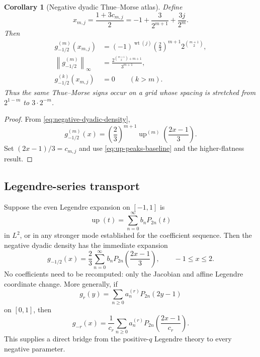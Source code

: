 \documentclass[11pt]{article}
\newtheorem{corollary}[theorem]{Corollary}
\theoremstyle{definition}
\newcommand{\Up}{\operatorname{up}}
\newcommand{\wt}{\operatorname{wt}}
\newcommand{\norm}[1]{\left\lVert #1\right\rVert}
\begin{document}
\begin{corollary}[Negative dyadic Thue--Morse atlas]\label{cor:negative-thue-morse}
Define
\begin{equation}
 x_{m,j}=\frac{1+3c_{m,j}}2
 =-1+\frac{3}{2^{m+1}}+\frac{3j}{2^m}.                    \label{eq:xmj}
\end{equation}
Then
\begin{align}
 g_{-1/2}^{(m)}(x_{m,j})
 &=(-1)^{\wt(j)}
   \left(\frac23\right)^{m+1}2^{\binom{m+1}{2}},          \label{eq:negative-peak-values}\\
 \norm{g_{-1/2}^{(m)}}_\infty
 &=\frac{2^{\binom{m+1}{2}+m+1}}{3^{m+1}},               \label{eq:negative-peak-norm}\\
 g_{-1/2}^{(k)}(x_{m,j})&=0\qquad(k>m).                   \label{eq:negative-flatness}
\end{align}
Thus the same Thue--Morse signs occur on a grid whose spacing is stretched from
\(2^{1-m}\) to \(3\cdot2^{-m}\).
\end{corollary}

\begin{proof}
From \cref{eq:negative-dyadic-density},
\[
 g_{-1/2}^{(m)}(x)=\left(\frac23\right)^{m+1}
 \Up^{(m)}\!\left(\frac{2x-1}{3}\right).
\]
Set \((2x-1)/3=c_{m,j}\) and use \cref{eq:up-peaks-baseline} and the higher-flatness
result.
\end{proof}

\subsection{Legendre-series transport}

Suppose the even Legendre expansion on \([-1,1]\) is
\begin{equation}
 \Up(t)=\sum_{n=0}^{\infty}b_nP_{2n}(t)                   \label{eq:up-legendre}
\end{equation}
in \(L^2\), or in any stronger mode established for the coefficient sequence.  Then the
negative dyadic density has the immediate expansion
\begin{equation}
 \boxed{
 g_{-1/2}(x)=\frac23\sum_{n=0}^{\infty}
 b_nP_{2n}\!\left(\frac{2x-1}{3}\right),
 \qquad -1\le x\le2.}                                    \label{eq:negative-legendre}
\end{equation}
No coefficients need to be recomputed: only the Jacobian and affine Legendre coordinate
change.  More generally, if
\[
 g_r(y)=\sum_{n\ge0}a_n^{(r)}P_{2n}(2y-1)
\]
on \([0,1]\), then
\begin{equation}
 g_{-r}(x)=\frac1{c_r}\sum_{n\ge0}a_n^{(r)}
 P_{2n}\!\left(\frac{2x-1}{c_r}\right).                  \label{eq:general-negative-legendre}
\end{equation}
This supplies a direct bridge from the positive-$q$ Legendre theory to every negative
parameter.
\end{document}
